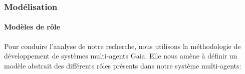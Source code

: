 \begin{frame}[shrink]
    \frametitle{Modélisation}
    \framesubtitle{Modèles de rôle}
    Pour conduire l'analyse de notre recherche, nous utilisons la méthodologie de développement de systèmes multi-agents Gaia.
    Elle nous amène à définir un modèle abstrait des différents rôles présents dans notre système multi-agents:

    
\end{frame}

%
%

%
%
%
%
%


